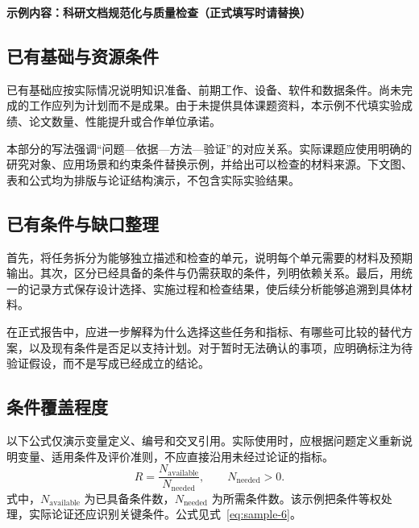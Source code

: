 \noindent\textbf{示例内容：科研文档规范化与质量检查（正式填写时请替换）}\par

\subsection{已有基础与资源条件}
已有基础应按实际情况说明知识准备、前期工作、设备、软件和数据条件。尚未完成的工作应列为计划而不是成果。由于未提供具体课题资料，本示例不代填实验成绩、论文数量、性能提升或合作单位承诺。

本部分的写法强调“问题—依据—方法—验证”的对应关系。实际课题应使用明确的研究对象、应用场景和约束条件替换示例，并给出可以检查的材料来源。下文图、表和公式均为排版与论证结构演示，不包含实际实验结果。

\subsection{已有条件与缺口整理}
首先，将任务拆分为能够独立描述和检查的单元，说明每个单元需要的材料及预期输出。其次，区分已经具备的条件与仍需获取的条件，列明依赖关系。最后，用统一的记录方式保存设计选择、实施过程和检查结果，使后续分析能够追溯到具体材料。

在正式报告中，应进一步解释为什么选择这些任务和指标、有哪些可比较的替代方案，以及现有条件是否足以支持计划。对于暂时无法确认的事项，应明确标注为待验证假设，而不是写成已经成立的结论。

\subsection{条件覆盖程度}
以下公式仅演示变量定义、编号和交叉引用。实际使用时，应根据问题定义重新说明变量、适用条件及评价准则，不应直接沿用未经过论证的指标。
\begin{equation}\label{eq:sample-6}
R=\frac{N_{\mathrm{available}}}{N_{\mathrm{needed}}},\qquad N_{\mathrm{needed}}>0.
\end{equation}
式中，$N_{\mathrm{available}}$ 为已具备条件数，$N_{\mathrm{needed}}$ 为所需条件数。该示例把条件等权处理，实际论证还应识别关键条件。公式见式~\eqref{eq:sample-6}。

